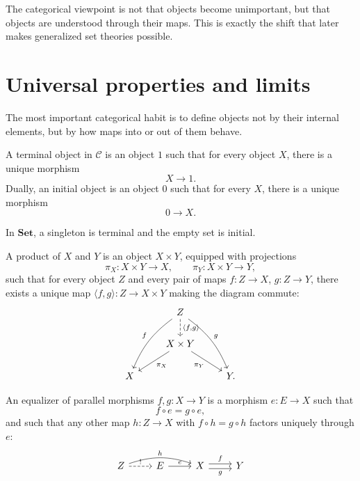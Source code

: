 \begin{remark}
The categorical viewpoint is not that objects become unimportant, but that objects are understood through their maps.  This is exactly the shift that later makes generalized set theories possible.
\end{remark}

\section{Universal properties and limits}

The most important categorical habit is to define objects not by their internal elements, but by how maps into or out of them behave.

\begin{definition}
A terminal object in \(\mathcal C\) is an object \(1\) such that for every object \(X\), there is a unique morphism
\[
  X\to1.
\]
Dually, an initial object is an object \(0\) such that for every \(X\), there is a unique morphism
\[
  0\to X.
\]
\end{definition}

In \(\mathbf{Set}\), a singleton is terminal and the empty set is initial.

\begin{definition}
A product of \(X\) and \(Y\) is an object \(X\times Y\), equipped with projections
\[
  \pi_X:X\times Y\to X,
  \qquad
  \pi_Y:X\times Y\to Y,
\]
such that for every object \(Z\) and every pair of maps \(f:Z\to X\), \(g:Z\to Y\), there exists a unique map \(\langle f,g\rangle:Z\to X\times Y\) making the diagram commute:
\[
\begin{tikzcd}
& Z \arrow[ddl,bend right=15,swap,"f"] \arrow[ddr,bend left=15,"g"] \arrow[d,dashed,"{\langle f,g\rangle}"] & \\
& X\times Y \arrow[dl,"\pi_X"] \arrow[dr,swap,"\pi_Y"] & \\
X && Y.
\end{tikzcd}
\]
\end{definition}

\begin{definition}
An equalizer of parallel morphisms \(f,g:X\to Y\) is a morphism \(e:E\to X\) such that
\[
  f\circ e=g\circ e,
\]
and such that any other map \(h:Z\to X\) with \(f\circ h=g\circ h\) factors uniquely through \(e\):
\[
\begin{tikzcd}
Z \arrow[r,dashed,"!" ] \arrow[rr,bend left=18,"h"] & E \arrow[r,"e"] & X \arrow[r,shift left,"f"] \arrow[r,shift right,swap,"g"] & Y
\end{tikzcd}
\]
\end{definition}

